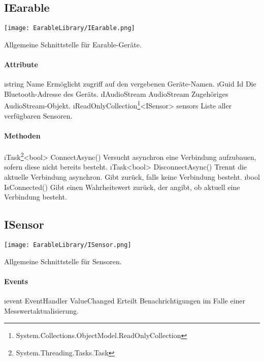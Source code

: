 \documentclass[../entwurf.tex]{subfiles}
\begin{document}
\subsection{IEarable}
\begin{center}
	\texttt{[image: EarableLibrary/IEarable.png]}
\end{center}
Allgemeine Schnittstelle für Earable-Geräte.
\paragraph{Attribute}
\begin{itemize}
	\i{string Name} Ermöglicht zugriff auf den vergebenen Geräte-Namen.
	\i{Guid Id} Die Bluetooth-Adresse des Geräts.
	\i{IAudioStream AudioStream} Zugehöriges AudioStream-Objekt.
	\i{ReadOnlyCollection\footnote{System.Collections.ObjectModel.ReadOnlyCollection}<ISensor> sensors} Liste aller verfügbaren Sensoren.
\end{itemize}
\paragraph{Methoden}
\begin{itemize}
	\i{Task\footnote{System.Threading.Tasks.Task}<bool> ConnectAsync()} Versucht asynchron eine Verbindung aufzubauen, sofern diese nicht bereits besteht.
	\i{Task<bool> DisconnectAsync()} Trennt die aktuelle Verbindung asynchron. Gibt  zurück, falls keine Verbindung besteht.
	\i{bool IsConnected()} Gibt einen Wahrheitswert zurück, der angibt, ob aktuell eine Verbindung besteht.
\end{itemize}

\subsection{ISensor}
\begin{center}
	\texttt{[image: EarableLibrary/ISensor.png]}
\end{center}
Allgemeine Schnittstelle für Sensoren.
\paragraph{Events}
\begin{itemize}
	\i{event EventHandler ValueChanged} Erteilt Benachrichtigungen im Falle einer Messwertaktualisierung.
\end{itemize}
\end{document}
